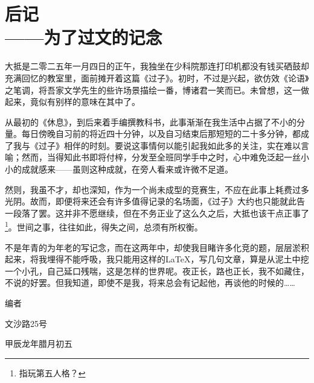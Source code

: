 \documentclass[b5paper,zihao=-4]{ctexbook}
\begin{document}
\newpage
\pagestyle{fancy}
\chapter*{\color[RGB]{0,0,0}后记\\ \normalsize——为了过文的记念}
大抵是二零二五年一月四日的正午，我独坐在少科院那连打印机都没有钱买硒鼓却充满回忆的教室里，面前摊开着这篇《过子》。初时，不过是兴起，欲仿效《论语》之笔调，将吾家文学先生的些许场景描绘一番，博诸君一笑而已。未曾想，这一做起来，竟似有别样的意味在其中了。

从最初的《休息》，到后来着手编撰教科书，此事渐渐在我生活中占据了不小的分量。每日傍晚自习前的将近四十分钟，以及自习结束后那短短的二十多分钟，都成了我与《过子》相伴的时刻。要说这事情何以能引起我如此多的关注，实在难以言喻；然而，当得知此书即将付梓，分发至全班同学手中之时，心中难免泛起一丝小小的成就感来——虽则这种成就，在旁人看来或许微不足道。

然则，我虽不才，却也深知，作为一个尚未成型的竞赛生，不应在此事上耗费过多光阴。故而，即便将来还会有许多值得记录的名场面，《过子》大约也只能就此告一段落了罢。这并非不愿继续，但在不务正业了这么久之后，大抵也该干点正事了\footnote[1]{指玩第五人格？}。世间之事，往往如此，得失之间，总须有所权衡。

不是年青的为年老的写记念，而在这两年中，却使我目睹许多化竞的题，层层淤积起来，将我埋得不能呼吸，我只能用这样的\LaTeX，写几句文章，算是从泥土中挖一个小孔，自己延口残喘，这是怎样的世界呢。夜正长，路也正长，我不如藏住，不说的好罢。但我知道，即使不是我，将来总会有记起他，再谈他的时候\mbox{的……}
\begin{flushright}
	编者
	
	文沙路25号
	
	甲辰龙年腊月初五
\end{flushright}

\end{document}
